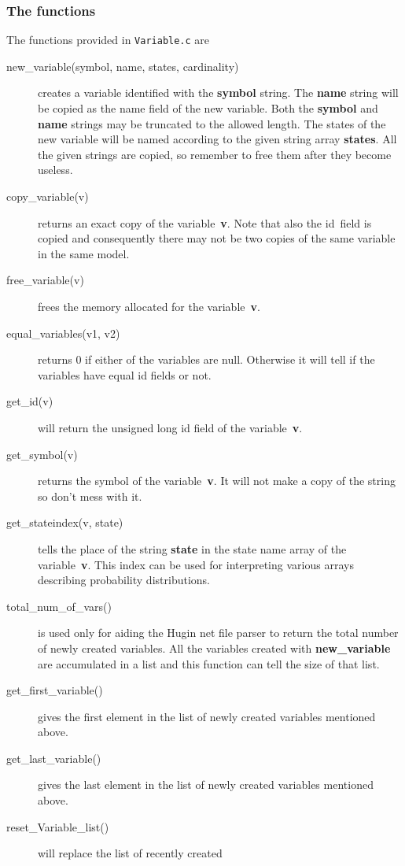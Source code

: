 \documentclass[12pt,a4paper]{report}
\begin{document}
\subsubsection{The functions}
The functions provided in \verb+Variable.c+ are
\begin{description}
\item[new\_variable(symbol, name, states, cardinality)] creates a
variable identified with the \textbf{symbol} string. The \textbf{name} 
string will be copied as the name field of the new variable. Both the 
\textbf{symbol} and \textbf{name} strings may be truncated to the 
allowed length. The states of the new variable will be named according 
to the given string array \textbf{states}. All the given strings are 
copied, so remember to free them after they become useless.
\item[copy\_variable(v)] returns an exact copy of the
variable~\textbf{v}. Note that also the id~field is copied and 
consequently there may not be two copies of the same variable in the 
same model.
\item[free\_variable(v)] frees the memory allocated for the
variable~\textbf{v}. 
\item[equal\_variables(v1, v2)] returns 0 if either of the variables
are null. Otherwise it will tell if the variables have equal id fields
or not.
\item[get\_id(v)] will return the unsigned long id field of the 
variable~\textbf{v}.
\item[get\_symbol(v)] returns the symbol of the variable~\textbf{v}. It
will not make a copy of the string so don't mess with it.
\item[get\_stateindex(v, state)] tells the place of the string
\textbf{state} in the state name array of the
variable~\textbf{v}. This index can be used for interpreting various
arrays describing probability distributions. 
\item[total\_num\_of\_vars()] is used only for aiding the Hugin net file
parser to return the total number of newly created variables. All 
the variables created with \textbf{new\_variable} are accumulated 
in a list and this function can tell the size of that list.
\item[get\_first\_variable()] gives the first element in the list
of newly created variables mentioned above.
\item[get\_last\_variable()] gives the last element in the list
of newly created variables mentioned above.
\item[reset\_Variable\_list()] will replace the list of recently created

\end{description}
\end{document}
